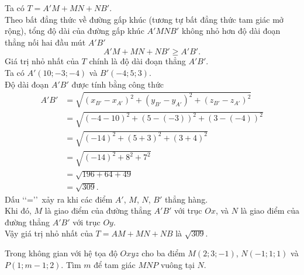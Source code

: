 \begin{bt}
{\begin{enumerate}[1.]
			Ta có $T=A'M+MN+NB'$. \\
			Theo bất đẳng thức về đường gấp khúc (tương tự bất đẳng thức tam giác mở rộng), tổng độ dài của đường gấp khúc $A'MNB'$ không nhỏ hơn độ dài đoạn thẳng nối hai đầu mút $A'B'$
			\begin{equation*}
				A'M + MN + NB' \geq A'B'.
			\end{equation*}
			Giá trị nhỏ nhất của $T$ chính là độ dài đoạn thẳng $A'B'$. \\
			Ta có $A'(10;-3;-4)$ và $B'(-4;5;3)$.\\
			Độ dài đoạn $A'B'$ được tính bằng công thức
			\begin{align*}
				A'B' &= \sqrt{(x_{B'} - x_{A'})^2 + (y_{B'} - y_{A'})^2 + (z_{B'} - z_{A'})^2} \\
				&= \sqrt{(-4-10)^2 + (5-(-3))^2 + (3-(-4))^2} \\
				&= \sqrt{(-14)^2 + (5+3)^2 + (3+4)^2} \\
				&= \sqrt{(-14)^2 + 8^2 + 7^2} \\
				&= \sqrt{196 + 64 + 49} \\
				&= \sqrt{309}.
			\end{align*}
			Dấu \lq\lq=\rq\rq~xảy ra khi các điểm $A'$, $M$, $N$, $B'$ thẳng hàng.\\ Khi đó, $M$ là giao điểm của đường thẳng $A'B'$ với trục $Ox$, và $N$ là giao điểm của đường thẳng $A'B'$ với trục $Oy$.\\
			Vậy giá trị nhỏ nhất của $T=AM+MN+NB$ là $\sqrt{309}$.
		\end{enumerate}
	}
\end{bt}

\begin{bt}%
	Trong không gian với hệ tọa độ $Oxyz$ cho ba điểm $M\left(2; 3; -1\right)$, $N\left(-1;1;1\right)$ và $P\left(1;m-1; 2\right)$. Tìm $m$ để tam giác $MNP$ vuông tại  $N$.
\end{bt}
